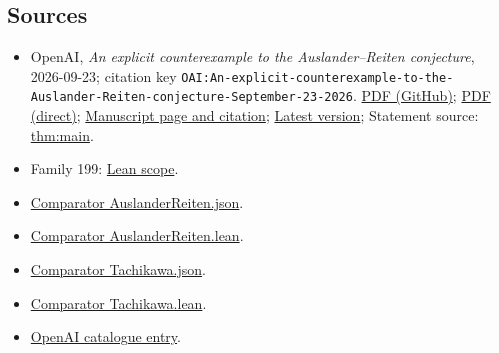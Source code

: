\documentclass[11pt]{article}
\begin{document}
\subsection{Sources}
\begin{itemize}
\item OpenAI, \emph{An explicit counterexample to the Auslander–Reiten conjecture}, 2026-09-23; citation key \texttt{OAI:An-explicit-counterexample-to-the-Auslander-Reiten-conjecture-September-23-2026}. \href{https://github.com/openai/math/blob/adc7f1241b42e322a6451854ab7e4b4c146bf78a/preprints/An-explicit-counterexample-to-the-Auslander-Reiten-conjecture-September-23-2026/paper.pdf}{PDF (GitHub)}; \href{https://github.com/openai/math/raw/adc7f1241b42e322a6451854ab7e4b4c146bf78a/preprints/An-explicit-counterexample-to-the-Auslander-Reiten-conjecture-September-23-2026/paper.pdf}{PDF (direct)}; \href{https://github.com/openai/math/blob/adc7f1241b42e322a6451854ab7e4b4c146bf78a/preprints/An-explicit-counterexample-to-the-Auslander-Reiten-conjecture-September-23-2026/README.md}{Manuscript page and citation}; \href{https://github.com/openai/math/blob/main/preprints/An-explicit-counterexample-to-the-Auslander-Reiten-conjecture-September-23-2026/paper.pdf}{Latest version}; Statement source: \href{https://github.com/openai/math/blob/adc7f1241b42e322a6451854ab7e4b4c146bf78a/preprints/An-explicit-counterexample-to-the-Auslander-Reiten-conjecture-September-23-2026/build/01-introduction.tex\#L26}{thm:main}.
\item Family 199: \href{https://github.com/openai/math/blob/adc7f1241b42e322a6451854ab7e4b4c146bf78a/lean/docs/199.md}{Lean scope}.
\item \href{https://github.com/openai/math/blob/adc7f1241b42e322a6451854ab7e4b4c146bf78a/lean/ComparatorChallenges/AuslanderReiten.json}{Comparator AuslanderReiten.json}.
\item \href{https://github.com/openai/math/blob/adc7f1241b42e322a6451854ab7e4b4c146bf78a/lean/ComparatorChallenges/AuslanderReiten.lean}{Comparator AuslanderReiten.lean}.
\item \href{https://github.com/openai/math/blob/adc7f1241b42e322a6451854ab7e4b4c146bf78a/lean/ComparatorChallenges/Tachikawa.json}{Comparator Tachikawa.json}.
\item \href{https://github.com/openai/math/blob/adc7f1241b42e322a6451854ab7e4b4c146bf78a/lean/ComparatorChallenges/Tachikawa.lean}{Comparator Tachikawa.lean}.
\item \href{https://github.com/openai/math/blob/adc7f1241b42e322a6451854ab7e4b4c146bf78a/CONTENTS.md}{OpenAI catalogue entry}.
\end{itemize}
\end{document}
